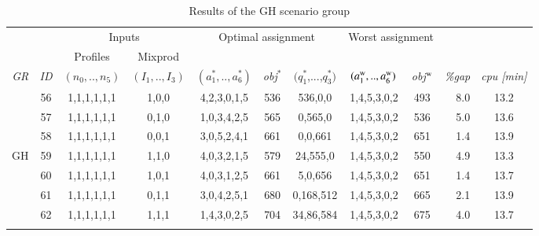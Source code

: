 \documentclass[review,12pt, 3p, times]{elsarticle}
\begin{document}
					
					
\begin{longtable}{|c|c|c|c|c|c|c|c|c|r|c|}
	\hline
	& & \multicolumn{2}{c|}{Inputs} & \multicolumn{3}{c|}{Optimal assignment} & \multicolumn{2}{c|}{Worst assignment }& \multicolumn{2}{c|}{}\\
	&  & Profiles & Mixprod & \multicolumn{3}{c|}{} & \multicolumn{2}{c|}{} & \multicolumn{2}{c|}{}\\
    \it{GR} & \it{ID} & \multicolumn{1}{c|}{$(n_0,..,n_5)$} & \multicolumn{1}{c|}{$(I_1,..,I_3)$} & {$(a^*_1,..,a^*_6)$} & \it{obj}$^*$ & $(q^*_1$,...,$q^*_3)$ & {$(a^{\textsc{w}}_1,..,a^{\textsc{w}}_6)$} & \it{obj}$^{\textsc{w}}$ & \it{\%gap}   & \it{ cpu [min]} \\								
	\hline 
									
	                   & 56      & 1,1,1,1,1,1                         & 1,0,0                               & 4,2,3,0,1,5          & 536          & 536,0,0               & 1,4,5,3,0,2                                & 493                     & 8.0     & 13.2   \\
	                   & 57      & 1,1,1,1,1,1                         & 0,1,0                               & 1,0,3,4,2,5          & 565          & 0,565,0               & 1,4,5,3,0,2                                & 536                     & 5.0 & 13.6  \\
	                   & 58      & 1,1,1,1,1,1                         & 0,0,1                               & 3,0,5,2,4,1          & 661          & 0,0,661               & 1,4,5,3,0,2                                & 651                     & 1.4    & 13.9 \\
	{GH}\label{SEN:GH} & 59      & 1,1,1,1,1,1                         & 1,1,0                               & 4,0,3,2,1,5          & 579          & 24,555,0               & 1,4,5,3,0,2                                & 550                     & 4.9    & 13.3     \\
	                   & 60      & 1,1,1,1,1,1                         & 1,0,1                               & 4,0,3,1,2,5          & 661          & 5,0,656               & 1,4,5,3,0,2                                & 651                     & 1.4   & 13.7      \\
	                   & 61      & 1,1,1,1,1,1                         & 0,1,1                               & 3,0,4,2,5,1          & 680          & 0,168,512              & 1,4,5,3,0,2                                & 665                     & 2.1      & 13.9  \\
	                   & 62      & 1,1,1,1,1,1                         & 1,1,1                               & 1,4,3,0,2,5          & 704          & 34,86,584              & 1,4,5,3,0,2                                & 675                     & 4.0    & 13.7     \\						        
	\hline
	\caption{Results of the GH scenario group} 
	\label{tab:tr4}
\end{longtable}
			
\end{document}
